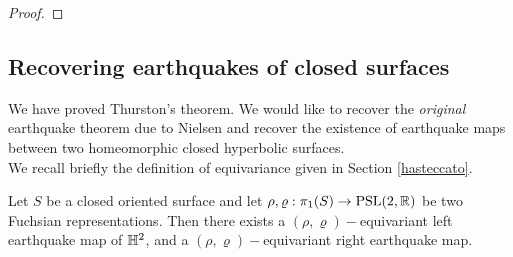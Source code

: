 \begin{proof}


 
\end{proof}

\subsection{Recovering earthquakes of closed surfaces}
We have proved Thurston's theorem. We would like to recover the \textit{original} earthquake theorem due to Nielsen and recover the existence of earthquake maps between two homeomorphic closed hyperbolic surfaces.\\
We recall briefly the definition of equivariance given in Section \ref{hasteccato}. 

\begin{corollary}
    Let $S$ be a closed oriented surface and let $\rho,\varrho:\pi_1(S)\to\text{PSL}(2,\mathbb{R})$ be two Fuchsian representations. Then there exists a $(\rho,\varrho)-$equivariant left earthquake map of $\mathbb{H}^2$, and a $(\rho,\varrho)-$equivariant right earthquake map. 
\end{corollary}

